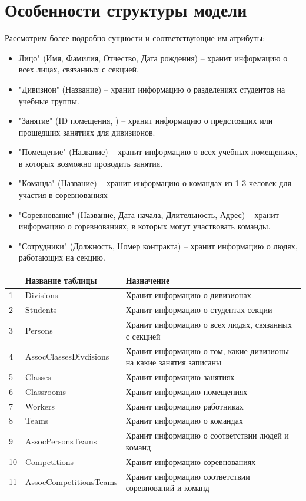 \documentclass[a4paper,12pt,preview]{report} %
\begin{document}
	\section{Особенности структуры модели}
	Рассмотрим более подробно сущности и соответствующие им атрибуты:
	\begin{itemize}
		\item Лицо" (Имя, Фамилия, Отчество, Дата рождения) -- хранит информацию о всех лицах, связанных с секцией.
		\item "Дивизион" (Название) -- хранит информацию о разделениях студентов на учебные группы.
		\item "Занятие" (ID помещения, ) -- хранит информацию о предстоящих или прошедших занятиях для дивизионов. 
		\item "Помещение" (Название) -- хранит информацию о всех учебных помещениях, в которых возможно проводить занятия.
		\item "Команда" (Название) -- хранит информацию о командах из 1-3 человек для участия в соревнованиях
		\item "Соревнование" (Название, Дата начала, Длительность, Адрес) -- хранит информацию о соревнованиях, в которых могут участвовать команды.
		\item "Сотрудники" (Должность, Номер контракта) -- хранит информацию о людях, работающих на секцию.
	\end{itemize}
	
	\begin{center}
		\begin{tabular}{ | m{5em} | m{5cm} | m{8cm} | } 
			\hline
			\textnumero & Название таблицы & Назначение \\ 	\hline \hline
			1 & Divisions & Хранит информацию о дивизионах \\ \hline
			2 & Students & Хранит информацию о студентах секции \\ \hline
			3 & Persons & Хранит информацию о всех людях, связанных с секцией \\ \hline
			4 & AssocClassesDivdisions & Хранит информацию о том, какие дивизионы на какие занятия записаны \\ \hline
			5 & Classes & Хранит информацию занятиях \\ \hline
			6 & Classrooms & Хранит информацию помещениях \\ \hline
			7 & Workers & Хранит информацию работниках \\ \hline
			8 & Teams & Хранит информацию о командах \\ \hline
			9 & AssocPersonsTeams & Хранит информацию о соответствии людей и команд \\ \hline
			10 & Competitions & Хранит информацию соревнованиях \\ \hline
			11 & AssocCompetitionsTeams & Хранит информацию соответствии соревнований и команд \\ \hline
		\end{tabular}
	\end{center}
	
\end{document}
